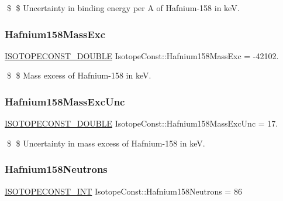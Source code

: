 \$ \$ Uncertainty in binding energy per A of Hafnium-\/158 in keV. \mbox{\label{group___isotope_const-_hafnium-_hf158_ga444b6925e94d24917b6e8ca0b98d11f5}} 
\subsubsection{\texorpdfstring{Hafnium158\+Mass\+Exc}{Hafnium158MassExc}}
{\footnotesize\ttfamily \mbox{\hyperlink{group___isotope_const-_macros_ga8f45a7272ce02c0b4c65c44636ed719a}{I\+S\+O\+T\+O\+P\+E\+C\+O\+N\+S\+T\+\_\+\+D\+O\+U\+B\+LE}} Isotope\+Const\+::\+Hafnium158\+Mass\+Exc = -\/42102.}

\$ \$ Mass excess of Hafnium-\/158 in keV. \mbox{\label{group___isotope_const-_hafnium-_hf158_gad326deb8220683e790e4e8d2a3f60696}} 
\subsubsection{\texorpdfstring{Hafnium158\+Mass\+Exc\+Unc}{Hafnium158MassExcUnc}}
{\footnotesize\ttfamily \mbox{\hyperlink{group___isotope_const-_macros_ga8f45a7272ce02c0b4c65c44636ed719a}{I\+S\+O\+T\+O\+P\+E\+C\+O\+N\+S\+T\+\_\+\+D\+O\+U\+B\+LE}} Isotope\+Const\+::\+Hafnium158\+Mass\+Exc\+Unc = 17.}

\$ \$ Uncertainty in mass excess of Hafnium-\/158 in keV. \mbox{\label{group___isotope_const-_hafnium-_hf158_ga9b5b29c68dfbc0a3d64185fb1d9c055d}} 
\subsubsection{\texorpdfstring{Hafnium158\+Neutrons}{Hafnium158Neutrons}}
{\footnotesize\ttfamily \mbox{\hyperlink{group___isotope_const-_macros_ga5f18360b3e99483a35c32d789e62621c}{I\+S\+O\+T\+O\+P\+E\+C\+O\+N\+S\+T\+\_\+\+I\+NT}} Isotope\+Const\+::\+Hafnium158\+Neutrons = 86}


